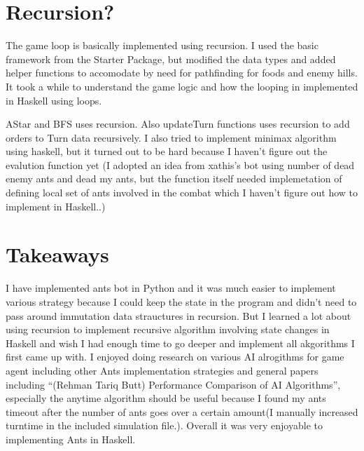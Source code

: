 \documentclass[11pt]{article}
\begin{document}
\section{Recursion?}
\label{sec-5}


The game loop is basically implemented using recursion. I used the basic framework from the Starter Package, but modified the data types and added helper functions to accomodate by need for pathfinding for foods and enemy hills. It took a while to understand the game logic and how the looping in implemented in Haskell using loops. 

AStar and BFS uses recursion. Also updateTurn functions uses recursion to add orders to Turn data recursively. I also tried to implement minimax algorithm using haskell, but it turned out to be hard because I haven't figure out the evalution function yet (I adopted an idea from xathis's bot using number of dead enemy ants and dead my ants, but the function itself needed implemetation of defining local set of ants involved in the combat which I haven't figure out how to implement in Haskell..)
\section{Takeaways}
\label{sec-6}


I have implemented ants bot in Python and it was much easier to implement various strategy because I could keep the state in the program and didn't need to pass around immutation data strauctures in recursion. But I learned a lot about using recursion to implement recursive algorithm involving state changes in Haskell and wish I had enough time to go deeper and implement all akgorithms I first came up with. I enjoyed doing research on various AI alrogithms for game agent including other Ants implementation strategies and general papers including ``(Rehman Tariq Butt) Performance Comparison of AI Algorithms'', especially the anytime algorithm should be useful because I found my ants timeout after the number of ants goes over a certain amount(I manually increased turntime in the included simulation file.). Overall it was very enjoyable to implementing Ants in Haskell.
\end{document}
